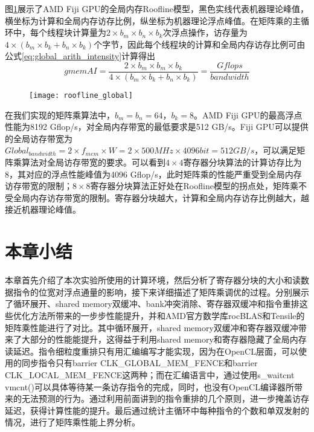 图\ref{fig:roofline_global}展示了AMD Fiji GPU的全局内存Roofline模型，黑色实线代表机器理论峰值，横坐标为计算和全局内存访存比例，纵坐标为机器理论浮点峰值。在矩阵乘的主循环中，每个线程块计算量为$2\times b_m \times b_n \times b_k$次浮点操作，访存量为$4\times (b_m \times b_k + b_n\times b_k)$个字节，因此每个线程块的计算和全局内存访存比例可由公式\ref{eq:global_arith_intensity}计算得出
\begin{equation}
\label{eq:global_arith_intensity}
gmemAI = \frac{2 \times b_m \times b_m \times b_k}{4\times (b_m \times b_k + b_n\times b_k)} = \frac{Gflops}{bandwidth}
\end{equation}

\begin{figure}[htbp]
	\centering
	\texttt{[image: roofline\_global]}
	\label{fig:roofline_global}
\end{figure}

在我们实现的矩阵乘算法中，$b_m = b_n = 64$，$b_k = 8$。AMD Fiji GPU的最高浮点性能为8192 Gflop/s，对全局内存带宽的最低要求是512 GB/s。Fiji GPU可以提供的全局访存带宽为$Global_{bandwidth} = 2 \times f_{mem} \times W = 2 \times 500MHz \times 4096bit = 512GB/s$，可以满足矩阵乘算法对全局访存带宽的要求。可以看到$4\times 4$寄存器分块算法的计算访存比为8，其对应的浮点性能峰值为4096 Gflop/s，此时矩阵乘的性能严重受到全局内存访存带宽的限制；$8\times 8$寄存器分块算法正好处在Roofline模型的拐点处，矩阵乘不受全局内存访存带宽的限制。寄存器分块越大，计算和全局内存访存比例越大，越接近机器理论峰值。


\section{本章小结}
本章首先介绍了本次实验所使用的计算环境，然后分析了寄存器分块的大小和读数据指令的位宽对浮点通量的影响，接下来详细描述了矩阵乘调优的过程。分别展示了循环展开、shared memory双缓冲、bank冲突消除、寄存器双缓冲和指令重排这些优化方法所带来的一步步性能提升，并和AMD官方数学库rocBLAS和Tensile的矩阵乘性能进行了对比。其中循环展开，shared memory双缓冲和寄存器双缓冲带来了大部分的性能能提升，这得益于利用shared memory和寄存器隐藏了全局内存读延迟。指令细粒度重排只有用汇编编写才能实现，因为在OpenCL层面，可以使用的同步指令只有barrier CLK\_GLOBAL\_MEM\_FENCE和barrier CLK\_LOCAL\_MEM\_FENCE这两种；而在汇编语言中，通过使用s\_waitcnt vmcnt()可以具体等待某一条访存指令的完成，同时，也没有OpenCL编译器所带来的无法预测的行为。通过利用前面讲到的指令重排的几个原则，进一步掩盖访存延迟，获得计算性能的提升。最后通过统计主循环中每种指令的个数和单双发射的情况，进行了矩阵乘性能上界分析。

